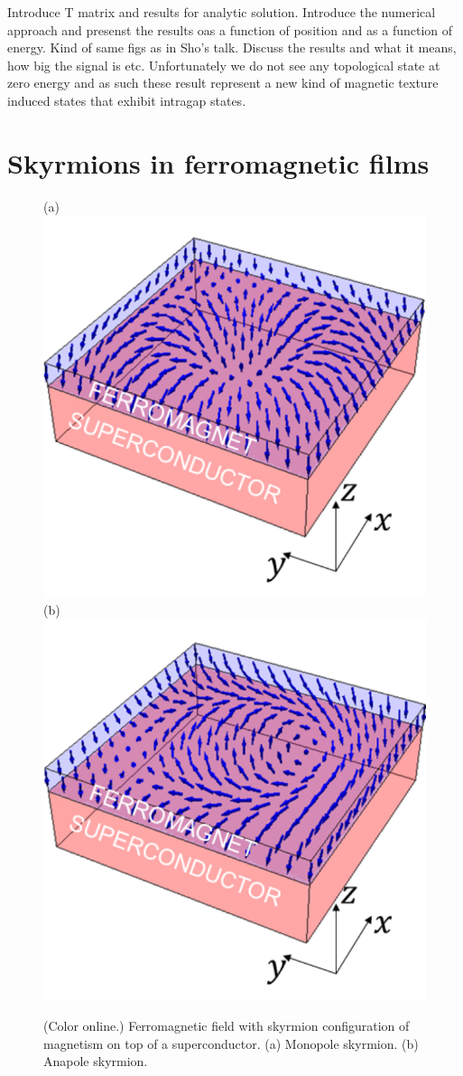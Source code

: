 \documentclass[twocolumn,showpacs,floatfix,nofootinbib,longbibliography]{revtex4-1}
\begin{document}
Introduce T matrix and results for analytic solution.  
Introduce the numerical approach and presenst the results oas a function of position and as a function of energy. Kind of same figs as in Sho’s talk. 
Discuss the results and what it means, how big the signal is etc. Unfortunately we do not see any topological state at zero energy and as such these result represent a new kind of magnetic texture induced states that exhibit intragap states.


\section{Skyrmions in ferromagnetic films} \label{sec:skyrmion}

\begin{figure} \centering
(a) \includegraphics[width=0.4\linewidth]{SkyrmA}  
(b) \includegraphics[width=0.4\linewidth]{SkyrmB} 
\caption{(Color online.) Ferromagnetic field with skyrmion configuration of magnetism on top of a superconductor. (a) Monopole skyrmion.  (b) Anapole skyrmion. } \label{fig:skyrmion}
\end{figure}
\end{document}
